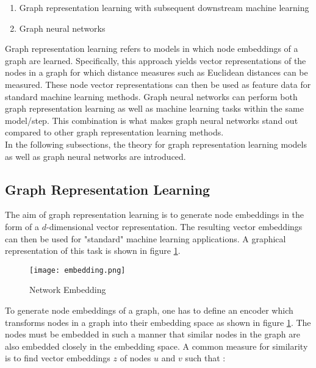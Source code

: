 	\begin{enumerate}
		\item Graph representation learning with subsequent downstream machine
			learning
		\item Graph neural networks
	\end{enumerate}
	
	\noindent Graph representation learning refers to models in which node
	embeddings of a graph are learned. Specifically, this approach yields
	vector representations of the nodes in a graph for which distance measures
	such as Euclidean distances can be measured. These node vector
	representations can then be used as feature data for standard machine
	learning methods. Graph neural networks can perform both graph representation
	learning as well as machine learning tasks within the same model/step. This
	combination is what makes graph neural networks stand out compared to other
	graph representation learning methods. \\

	\noindent In the following subsections, the theory for graph representation 
	learning models as well as graph neural networks are introduced. 

	\subsection{Graph Representation Learning}

	The aim of graph representation learning is to generate node embeddings in 
	the form of a $d$-dimensional vector representation. The resulting vector 
	embeddings can then be used for "standard" machine learning applications. 
	A graphical representation of this task is shown in figure 
	\ref{fig:embedding}.

	\begin{figure}[h]
		\centering
		\texttt{[image: embedding.png]}
		\caption{Network Embedding}
		\cite{leskovec2021lecture}
		\label{fig:embedding}
	\end{figure}

	\noindent To generate node embeddings of a graph, one has to define an
	encoder which transforms nodes in a graph into their embedding space as
	shown in figure \ref{fig:embedding}. The nodes must be embedded in such a
	manner that similar nodes in the graph are also embedded closely in the 
	embedding space. A common measure for similarity is to find vector embeddings 
	$z$ of nodes $u$ and $v$ such that \citep{leskovec2021lecture}:

